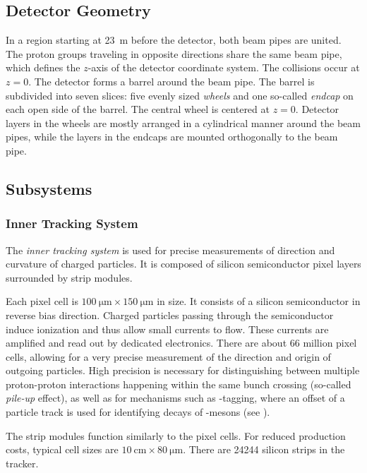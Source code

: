 \subsection{Detector Geometry}
In a region starting at \SI{23}{\m} before the detector, both beam pipes are united\cite{Evans:LHCMachine}. The proton groups traveling in opposite directions share the same beam pipe, which defines the $z$-axis of the detector coordinate system. The collisions occur at $z = 0$.
The detector forms a barrel around the beam pipe. The barrel is subdivided into seven slices: five evenly sized \emph{wheels} and one so-called \emph{endcap} on each open side of the barrel. The central wheel is centered at $z = 0$.
Detector layers in the wheels are mostly arranged in a cylindrical manner around the beam pipes, while the layers in the endcaps are mounted orthogonally to the beam pipe.

\subsection{Subsystems}
\subsubsection{Inner Tracking System}
The \emph{inner tracking system} is used for precise measurements of direction and curvature of charged particles. 
It is composed of silicon semiconductor pixel layers surrounded by strip modules.

Each pixel cell is $\SI{100}{\micro\meter} \times \SI{150}{\micro\meter}$ in size. It consists of a silicon semiconductor in reverse bias direction. Charged particles passing through the semiconductor induce ionization and thus allow small currents to flow. These currents are amplified and read out by dedicated electronics. There are about \num{66} million pixel cells, allowing for a very precise measurement of the direction and origin of outgoing particles. High precision is necessary for distinguishing between multiple proton-proton interactions happening within the same bunch crossing (so-called \emph{pile-up} effect), as well as for mechanisms such as \Pbottom-tagging, where an offset of a particle track is used for identifying decays of \PB-mesons (see ).

The strip modules function similarly to the pixel cells. For reduced production costs, typical cell sizes are $\SI{10}{\centi\meter} \times \SI{80}{\micro\meter}$. There are \num{24244} silicon strips in the tracker.


